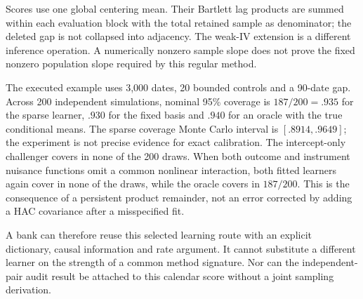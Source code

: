 Scores use one global centering mean. Their Bartlett lag products are summed
within each evaluation block with the total retained sample as denominator;
the deleted gap is not collapsed into adjacency. The weak-IV extension is a
different inference operation. A numerically nonzero sample slope does not
prove the fixed nonzero population slope required by this regular method.

The executed example uses 3,000 dates, 20 bounded controls and a 90-date gap.
Across 200 independent simulations, nominal 95\% coverage is $187/200=.935$
for the sparse learner, $.930$ for the fixed basis and $.940$ for an oracle
with the true conditional means. The sparse coverage Monte Carlo interval is
$[.8914,.9649]$; the experiment is not precise evidence for exact calibration.
The intercept-only challenger covers in none of the 200 draws. When both
outcome and instrument nuisance functions omit a common nonlinear interaction,
both fitted learners again cover in none of the draws, while the oracle covers
in $187/200$. This is the consequence of a persistent product remainder, not
an error corrected by adding a HAC covariance after a misspecified fit.

A bank can therefore reuse this selected learning route with an explicit
dictionary, causal information and rate argument. It cannot substitute a
different learner on the strength of a common method signature. Nor can the
independent-pair audit result be attached to this calendar score without a
joint sampling derivation.

